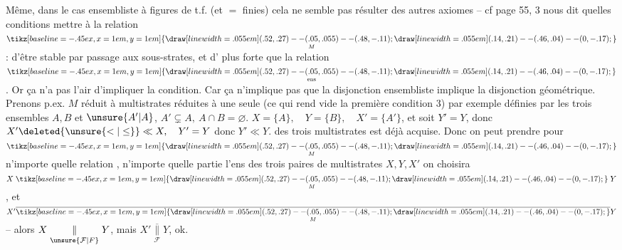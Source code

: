 Même, dans le cas ensembliste à figures de t.f.
(et $=$ finies) cela ne semble pas résulter
des autres axiomes -- cf page 55,
 3 nous dit quelles conditions
mettre à la relation $\underset{M}{\mathrel{\tikz[baseline=-.45ex,x=1em,y=1em]{\draw[line width=.055em] (.52,.27)--(.05,.055)--(.48,-.11); \draw[line width=.055em] (.14,.21)--(.46,.04)--(0,-.17);}}}$  : d'être
stable par passage aux sous-strates, et
d'  plus forte que la relation $\underset{\mathrm{ens}}{\mathrel{\tikz[baseline=-.45ex,x=1em,y=1em]{\draw[line width=.055em] (.52,.27)--(.05,.055)--(.48,-.11); \draw[line width=.055em] (.14,.21)--(.46,.04)--(0,-.17);}}}$.
Or ça n'a pas l'air d'impliquer la condition.
Car ça n'implique pas que 
la disjonction ensembliste implique la disjonction géométrique. Prenons p.ex.
$M$ réduit à   multistrates 
réduites à une seule   (ce qui
rend vide la première condition  3)
par exemple définies par les trois ensembles
$A,B$ et $\unsure{A'|A}$, $A'\subsetneq A,\ A\cap B=\varnothing$. 
 $X=\{A\},\quad Y=\{B\},\quad X'=\{A'\}$, et soit $Y'=Y$,
donc $X'\deleted{\unsure{<|\leq}}\ll X,\quad Y'=Y$ donc $Y'\ll Y$.  
  des trois
multistrates est déjà acquise. Donc on
peut prendre pour $\underset{M}{\mathrel{\tikz[baseline=-.45ex,x=1em,y=1em]{\draw[line width=.055em] (.52,.27)--(.05,.055)--(.48,-.11); \draw[line width=.055em] (.14,.21)--(.46,.04)--(0,-.17);}}}$ n'importe quelle
relation ,   n'importe quelle
partie   l'ens des
trois paires de  multistrates $X,Y,X'$
on choisira $X\underset{M}{\mathrel{\tikz[baseline=-.45ex,x=1em,y=1em]{\draw[line width=.055em] (.52,.27)--(.05,.055)--(.48,-.11); \draw[line width=.055em] (.14,.21)--(.46,.04)--(0,-.17);}}}Y$, et $X'\underset{M}{\overline{\mathrel{\tikz[baseline=-.45ex,x=1em,y=1em]{\draw[line width=.055em] (.52,.27)--(.05,.055)--(.48,-.11); \draw[line width=.055em] (.14,.21)--(.46,.04)--(0,-.17);}}}}Y$ --
alors $X\underset{\unsure{\mathcal F|F}}{\parallel}Y$, mais $X'\underset{\mathcal F}{\overline{\parallel}}Y$, ok.

